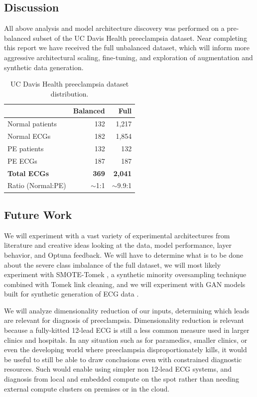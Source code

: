 \documentclass[sigconf,nonacm]{acmart}
\begin{document}
\subsection{Discussion}
All above analysis and model architecture discovery was performed on a pre-balanced subset of the UC Davis Health preeclampsia dataset. Near completing this report we have received the full unbalanced dataset, which will inform more aggressive architectural scaling, fine-tuning, and exploration of augmentation and synthetic data generation.

\begin{table}[H]
\centering
\caption{UC Davis Health preeclampsia dataset distribution.}
\label{tab:ucdh-dataset}
\small
\begin{tabular}{lrr}
\toprule
& \textbf{Balanced} & \textbf{Full} \\
\midrule
Normal patients & 132 & 1,217 \\
Normal ECGs & 182 & 1,854 \\
\midrule
PE patients & 132 & 132 \\
PE ECGs & 187 & 187 \\
\midrule
\textbf{Total ECGs} & \textbf{369} & \textbf{2,041} \\
Ratio (Normal:PE) & $\sim$1:1 & $\sim$9.9:1 \\
\bottomrule
\end{tabular}
\end{table}

\subsection{Future Work}

We will experiment with a vast variety of experimental architectures from literature and creative ideas looking at the data, model performance, layer behavior, and Optuna feedback. We will have to determine what is to be done about the severe class imbalance of the full dataset, we will most likely experiment with SMOTE-Tomek \cite{batista_study_2004}, a synthetic minority oversampling technique combined with Tomek link cleaning, and we will experiment with GAN models built for synthetic generation of ECG data \cite{xia_generative_2023}.

We will analyze dimensionality reduction of our inputs, determining which leads are relevant for diagnosis of preeclampsia. Dimensionality reduction is relevant because a fully-kitted 12-lead ECG is still a less common measure used in larger clinics and hospitals. In any situation such as for paramedics, smaller clinics, or even the developing world where preeclampsia disproportionately kills, it would be useful to still be able to draw conclusions even with constrained diagnostic resources. Such would enable using simpler non 12-lead ECG systems, and diagnosis from local and embedded compute on the spot rather than needing external compute clusters on premises or in the cloud.
\end{document}
